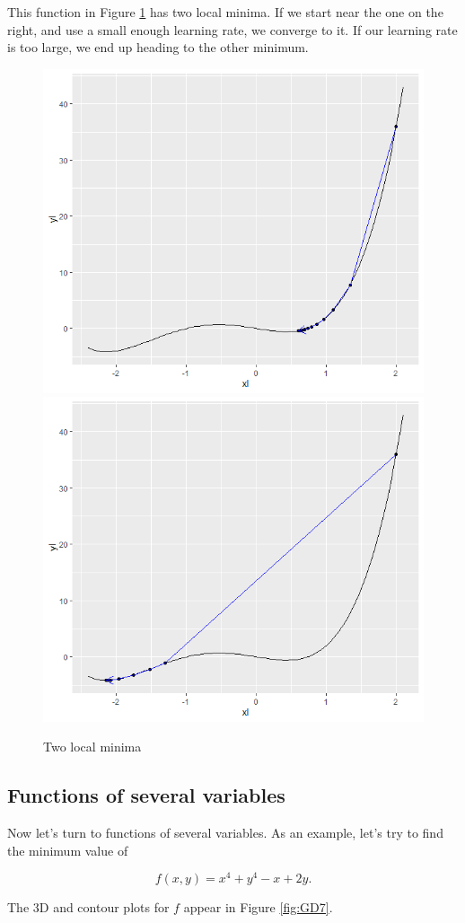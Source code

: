 \documentclass[
]{book}
\theoremstyle{definition}
\theoremstyle{definition}
\theoremstyle{definition}
\theoremstyle{definition}
\theoremstyle{remark}
\begin{document}
This function in Figure \ref{fig:GD6} has two local minima. If we start near the one on the right, and use a small enough learning rate, we converge to it. If our learning rate is too large, we end up heading to the other minimum.

\begin{figure}

{\centering \includegraphics[width=0.4\linewidth]{images/gd6} \includegraphics[width=0.4\linewidth]{images/gd7} 

}

\caption{Two local minima}\label{fig:GD6}
\end{figure}

\subsection*{Functions of several variables}\label{functions-of-several-variables}

Now let's turn to functions of several variables. As an example, let's try to find the minimum value of

\[f(x,y)=x^4+y^4-x+2y.\]

The 3D and contour plots for \(f\) appear in Figure \ref{fig:GD7}.
\end{document}
